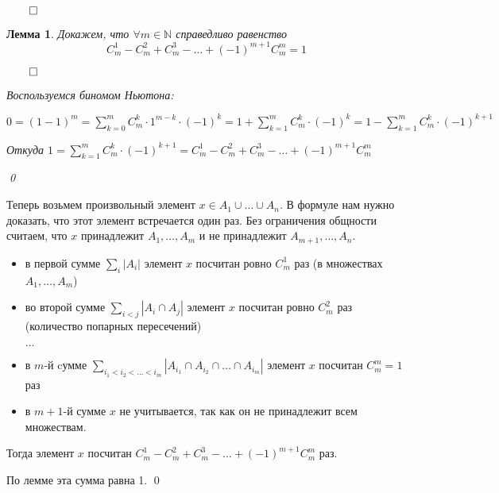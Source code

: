 \documentclass[a4paper,12pt,leqno]{article}
\theoremstyle{plain} %
\newtheorem{lemma}{Лемма}
\theoremstyle{definition} %
\renewenvironment{proof}{$\qed$}{{\qed}} %
\begin{document}
\begin{proof}

\begin{lemma}
Докажем, что $\forall m \in \mathbb{N}$ справедливо равенство
\[C_m^1 - C_m^2 + C_m^3 - \dots + (-1)^{m+1}C_m^m = 1\]

\begin{proof}

Воспользуемся биномом Ньютона:

$0 = (1 - 1)^m = \sum\limits_{k=0}^m C_m^k \cdot 1^{m-k} \cdot (-1)^k = 1 + \sum\limits_{k=1}^m C_m^k \cdot (-1)^k = 1 - \sum\limits_{k=1}^m C_m^k \cdot (-1)^{k+1}$

Откуда $1 = \sum\limits_{k=1}^m C_m^k \cdot (-1)^{k+1} = C_m^1 - C_m^2 + C_m^3 - \dots + (-1)^{m+1}C_m^m $

\end{proof}
\end{lemma}

Теперь возьмем произвольный элемент $x \in A_1 \cup \dots \cup A_n$. В формуле нам нужно доказать, что этот элемент встречается один раз. Без ограничения общности считаем, что $x$ принадлежит $A_1,\dots,A_m$ и не принадлежит $A_{m+1},\dots,A_n$.

\begin{itemize}
    \item в первой сумме $\sum\limits_i |A_i|$ элемент $x$ посчитан ровно $C_m^1$ раз (в множествах $A_1,\dots,A_m$)
    
    \item во второй сумме $\sum\limits_{i < j} |A_i \cap A_j|$ элемент $x$ посчитан ровно $C_m^2$ раз (количество попарных пересечений)
    
    $\dots$
    
    \item в $m$-й cумме $\sum\limits_{i_1 < i_2 < \dots < i_m} |A_{i_1} \cap A_{i_2} \cap \dots \cap A_{i_m}|$ элемент $x$ посчитан $C_m^m = 1$ раз
    
    \item в $m+1$-й сумме $x$ не учитывается, так как он не принадлежит всем множествам.
\end{itemize}

Тогда элемент $x$ посчитан $C_m^1 - C_m^2 + C_m^3 - \dots + (-1)^{m+1}C_m^m$ раз. 

По лемме эта сумма равна 1.
\end{proof}
\end{document}
